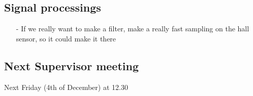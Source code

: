 \subsection{Signal processings}
\begin{itemize}
\item[-] If we really want to make a filter, make a really fast sampling on the hall sensor, so it could make it there
\end{itemize}


\subsection{Next Supervisor meeting}
Next Friday (4th of December) at 12.30



